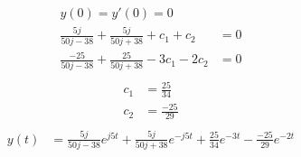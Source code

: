 \documentclass[10pt,a4paper, margin=1in]{article}
\begin{document}
\begin{enumerate}
\begin{enumerate}
    \begin{align*}
        y(0) = y'(0) = 0& \\
        \frac{5j}{50j - 38} + \frac{5j}{50j + 38} + c_1 + c_2 & = 0\\
        \frac{-25}{50j - 38} + \frac{25}{50j + 38} - 3c_1 - 2c_2 & = 0\\
    \end{align*}
    \begin{align*}
        c_1 & = \frac{25}{34} \\
        c_2 & = \frac{-25}{29} \\
    \end{align*}
    \begin{align*}
        y(t) & = \frac{5j}{50j - 38}e^{j5t} + \frac{5j}{50j + 38}e^{-j5t} + \frac{25}{34}e^{-3t} - \frac{-25}{29}e^{-2t}\\
    \end{align*}
    \end{enumerate}    
    

\end{enumerate}
\end{document}
